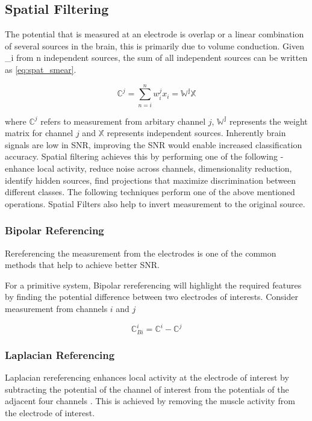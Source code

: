 \subsection{Spatial Filtering}
The potential that is measured at an electrode is overlap or a linear combination of several sources in the brain, this is primarily due to volume conduction. Given _i
from n independent sources, the sum of all independent sources can be written as \ref{eq:spat_smear}.

\begin{equation} \label{eq:spat_smear}
    \mathbb{C}^{j} = \sum_{n = i}^{n} w_{i}^{j} x_{i} = \mathbb{W^{j} X} 
\end{equation}

where $\mathbb{C}^{j} $ refers to measurement from arbitary channel $j$,  $\mathbb{W^j}$ represents the weight matrix for channel $j$ and $\mathbb{X}$ represents independent sources.
Inherently brain signals are low in SNR, improving the SNR would enable increased classification accuracy. Spatial filtering achieves this by performing one of the following 
- enhance local activity, reduce noise across channels, dimensionality reduction, identify hidden sources, find projections that maximize
discrimination between different classes. The following techniques perform one of the above mentioned operations. Spatial Filters also help to invert measurement to the
original source.

\subsubsection{Bipolar Referencing}
Rereferencing the measurement from the electrodes is one of the common methods that help to achieve better SNR.

For a primitive system, Bipolar rereferencing will highlight the required features by finding the potential difference between two electrodes of interests. Consider measurement from 
channels $i$ and $j$

\begin{equation} \label{eq:bip_eeg}
    \mathbb{C}^{i}_{Bi} =  \mathbb{C}^{i} - \mathbb{C}^{j}
\end{equation}

\subsubsection{Laplacian Referencing}
Laplacian rereferencing enhances local activity at the electrode of interest by subtracting the potential of the channel of interest from the potentials of the adjacent 
four channels \theta. This is achieved by removing the muscle activity from the electrode of interest.

